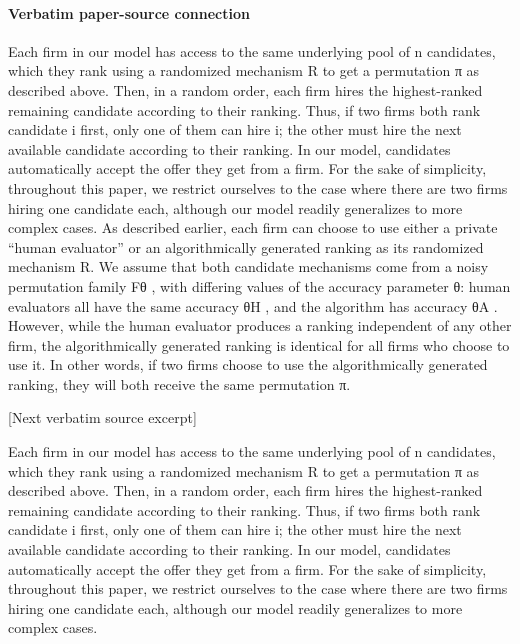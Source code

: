 \documentclass[10pt]{article}
\begin{document}
\paragraph{Verbatim paper-source connection}
\begin{ReviewVerbatim}
Each firm in our model has access to the same underlying pool of n candidates, which they rank using
a randomized mechanism R to get a permutation π as described above. Then, in a random order, each
firm hires the highest-ranked remaining candidate according to their ranking. Thus, if two firms both rank
candidate i first, only one of them can hire i; the other must hire the next available candidate according to
their ranking. In our model, candidates automatically accept the offer they get from a firm. For the sake
of simplicity, throughout this paper, we restrict ourselves to the case where there are two firms hiring one
candidate each, although our model readily generalizes to more complex cases.
As described earlier, each firm can choose to use either a private “human evaluator” or an algorithmically
generated ranking as its randomized mechanism R. We assume that both candidate mechanisms come from
a noisy permutation family Fθ , with differing values of the accuracy parameter θ: human evaluators all have
the same accuracy θH , and the algorithm has accuracy θA . However, while the human evaluator produces a
ranking independent of any other firm, the algorithmically generated ranking is identical for all firms who
choose to use it. In other words, if two firms choose to use the algorithmically generated ranking, they will
both receive the same permutation π.

[Next verbatim source excerpt]

Each firm in our model has access to the same underlying pool of n candidates, which they rank using
a randomized mechanism R to get a permutation π as described above. Then, in a random order, each
firm hires the highest-ranked remaining candidate according to their ranking. Thus, if two firms both rank
candidate i first, only one of them can hire i; the other must hire the next available candidate according to
their ranking. In our model, candidates automatically accept the offer they get from a firm. For the sake
of simplicity, throughout this paper, we restrict ourselves to the case where there are two firms hiring one
candidate each, although our model readily generalizes to more complex cases.
\end{ReviewVerbatim}

\end{document}
